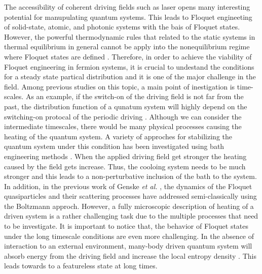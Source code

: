 \documentclass{article}
\begin{document}
The accessibility of coherent driving fields such as laser opens many interesting potential for manupulating quantum systems. This leads to Floquet engineeting of solid-state, atomic, and photonic systems with the bais of Floquet states. However, the powerful thermodynamic rules that related to the static systems in thermal equilibrium in general cannot be apply into the nonequilibrium regime where Floquet states are defined \cite{seetharam2015}. Therefore, in order to achieve the viability of Floquet engineering in fermion systems, it is crucial to undestand the conditions for a steady state partical distribution and it is one of the major challenge in the field. Among previous studies on this topic, a main point of inestigation is time-scales. As an example, if the switch-on of the driving field is not far from the past, the distribution function of a qunatum system will highly depend on the switching-on protocal of the periodic driving \cite{dehghani2014}. Although we can consider the intermediate timescales, there would be many physical processes causing the heating of the quantum system. A variety of approches for stabilizing the quantum system under this condition has been investigated using bath engineering methods \cite{seetharam2015,weidinger2017,seetharam2019,rudner2020}. When the applied driving field get stronger the heating caused by the field gets increase. Thus, the cooloing system needs to be much stronger and this leads to a non-perturbative inclusion of the bath to the system. In addition, in the previous work of Genske \textit{et al.} \cite{genske2015}, the dynamics of the Floquet quasiparticles and their scattering processes have addressed semi-classically using the Boltzmann approch. However, a fully microscopic description of heating of a driven system is a rather challenging task due to the multiple processes that need to be investigate.
It is important to notice that, the behavior of Floquet states under the long timescale conditions are even more challenging. In the absence of interaction to an external environment, many-body driven quantum system will absorb energy from the driving field and increase the local entropy density \cite{rudner2020}. This leads towards to a featureless state at long times.
\end{document}
